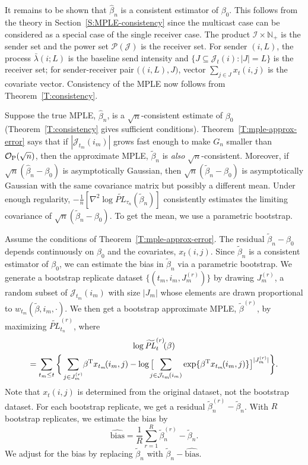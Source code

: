 \documentclass[aoas,preprint]{imsart}
\begin{document}
It remains to be shown that $\hat \beta_n$ is a consistent estimator of
$\beta_0$.  This follows from the theory in Section~\ref{S:MPLE-consistency} 
since the multicast case can be considered as a special case of
the single receiver case.  The product $\mathcal{I} \times \mathbb{N}_+$
is the sender set and the power set $\mathcal{P}(\mathcal{J})$ is the
receiver set.  For sender $(i,L)$, the process $\bar \lambda(i ; L)$ is the
baseline send intensity and $\{ J \subseteq \mathcal{J}_t(i) : |J| = L\}$ is the receiver set; for
sender-receiver pair $\big((i,L), J\big)$, vector $\sum_{j \in J} x_t(i,j)$ is
the covariate vector.  Consistency of the MPLE now follows from
Theorem~\ref{T:consistency}.



Suppose the true MPLE, $\hat \beta_n$, is a $\sqrt{n}$-consistent estimate of
$\beta_0$ (Theorem~\ref{T:consistency} gives sufficient conditions).
Theorem~\ref{T:mple-approx-error} says that if
$|\mathcal{J}_{t_m}(i_m)|$ grows fast enough to make $G_n$ smaller than
$\mathcal{O}_\text{P}(\sqrt{n})$, then the approximate MPLE, $\tilde \beta_n$ is \emph{also}
$\sqrt{n}$-consistent.
Moreover, if $\sqrt{n}(\hat \beta_n - \beta_0)$ is asymptotically Gaussian,
then $\sqrt{n}(\tilde \beta_n - \beta_0)$ is asymptotically Gaussian with
the same covariance matrix but possibly a different mean.
Under enough regularity,
\(
    -\tfrac{1}{n} [
        \nabla^2 \log \widetilde{\mathit{PL}}_{\tau_n}(\tilde \beta_n)
    ]
\)
consistently estimates the limiting covariance
of $\sqrt{n}(\tilde \beta_n - \beta_0)$.  To get the mean, we use
a parametric bootstrap.

Assume the conditions of Theorem~\ref{T:mple-approx-error}.
The residual $\tilde \beta_n - \beta_0$ depends continuously on $\beta_0$
and the covariates, $x_t(i,j)$.  Since $\tilde \beta_n$ is a consistent
estimator of $\beta_0$, we can estimate the bias in $\tilde \beta_n$ via
a parametric bootstrap.  We generate a bootstrap replicate dataset
$\{ (t_m, i_m, J_m^{(r)}) \}$ by drawing $J_m^{(r)}$, a random subset
of $\mathcal{J}_{t_m}(i_m)$ with size $|J_m|$ whose elements are drawn
proportional to $w_{t_m}(\tilde \beta, i_m, \cdot)$.
We then get a bootstrap approximate MPLE, $\tilde \beta^{(r)}$, by maximizing
$\widetilde{\mathit{PL}}_{t_n}^{(r)}$, where
\begin{multline*}
    \log \widetilde{\mathit{PL}}_{t}^{(r)}\!(\beta) \\
        =
        \sum_{t_m \leq t}
        \bigg\{
            \sum_{j \in J_m^{(r)}}\!
                \beta^\trans x_{t_m}\!(i_m, j)
            -
            \log\big[
                \!\!\!\!
                \sum_{j \in \mathcal{J}_{t_m}\!(i_m)}
                    \exp\{ \beta^\trans x_{t_m}\!(i_m, j)\}
            \big]^{|J_m^{(r)}|}
        \bigg\}.
\end{multline*}
Note that $x_t(i,j)$ is determined from the original dataset, not the
bootstrap dataset.  For each bootstrap replicate, we get a residual
$\tilde \beta_n^{(r)} - \tilde \beta_n$.  With $R$ bootstrap
replicates, we estimate the bias by
\[
    \widehat{\mathrm{bias}}
        =
            \frac{1}{R} \sum_{r=1}^{R} \tilde \beta_n^{(r)} - \tilde \beta_n.
\]
We adjust for the bias by replacing $\tilde \beta_n$ with
$\tilde \beta_n - \widehat{\mathrm{bias}}$.
\end{document}
